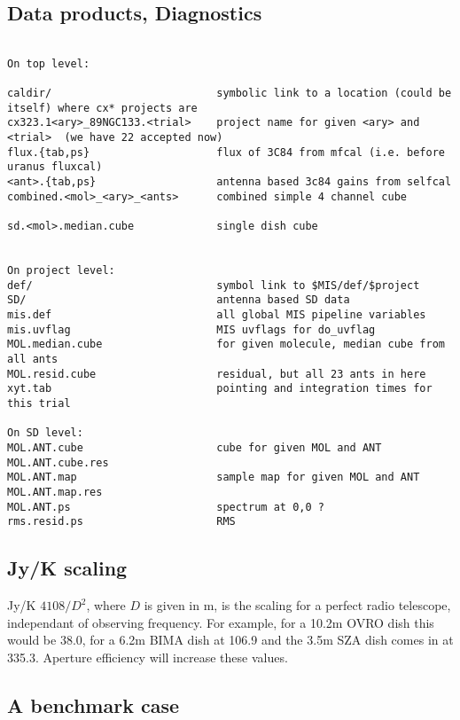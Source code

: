 \documentclass[preprint]{aastex} %
\begin{document}
\subsection{Data products, Diagnostics}
\footnotesize
\begin{verbatim}

On top level:

caldir/                          symbolic link to a location (could be itself) where cx* projects are
cx323.1<ary>_89NGC133.<trial>    project name for given <ary> and <trial>  (we have 22 accepted now)
flux.{tab,ps}                    flux of 3C84 from mfcal (i.e. before uranus fluxcal)
<ant>.{tab,ps}                   antenna based 3c84 gains from selfcal
combined.<mol>_<ary>_<ants>      combined simple 4 channel cube

sd.<mol>.median.cube             single dish cube


On project level:
def/                             symbol link to $MIS/def/$project
SD/                              antenna based SD data
mis.def                          all global MIS pipeline variables
mis.uvflag                       MIS uvflags for do_uvflag
MOL.median.cube                  for given molecule, median cube from all ants
MOL.resid.cube                   residual, but all 23 ants in here 
xyt.tab                          pointing and integration times for this trial

On SD level:
MOL.ANT.cube                     cube for given MOL and ANT
MOL.ANT.cube.res
MOL.ANT.map                      sample map for given MOL and ANT
MOL.ANT.map.res
MOL.ANT.ps                       spectrum at 0,0 ?
rms.resid.ps                     RMS

\end{verbatim} 
\normalsize

\subsection{Jy/K scaling}

Jy/K  $4108/D^2$, where $D$ is given in m, is the scaling for a perfect radio
telescope, independant of observing frequency. For example, for a 10.2m OVRO
dish this would be 38.0, for a 6.2m BIMA dish at 106.9 and the 3.5m SZA dish
comes in at 335.3. Aperture efficiency will increase these values.

\subsection{A benchmark case}
\end{document}
